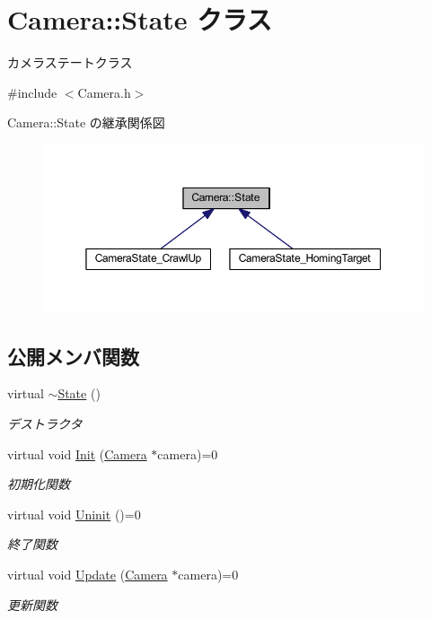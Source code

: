 \hypertarget{class_camera_1_1_state}{}\section{Camera\+:\+:State クラス}
\label{class_camera_1_1_state}


カメラステートクラス  




{\ttfamily \#include $<$Camera.\+h$>$}



Camera\+:\+:State の継承関係図\nopagebreak
\begin{figure}[H]
\begin{center}
\leavevmode
\includegraphics[width=350pt]{class_camera_1_1_state__inherit__graph}
\end{center}
\end{figure}
\subsection*{公開メンバ関数}
\begin{DoxyCompactItemize}
\item 
virtual \mbox{\hyperlink{class_camera_1_1_state_a61b74bb711d49e26c0f07af65fb74eb9}{$\sim$\+State}} ()
\begin{DoxyCompactList}\small\item\em デストラクタ \end{DoxyCompactList}\item 
virtual void \mbox{\hyperlink{class_camera_1_1_state_aa1b81471ab15e64b3117ffe7de9560ff}{Init}} (\mbox{\hyperlink{class_camera}{Camera}} $\ast$camera)=0
\begin{DoxyCompactList}\small\item\em 初期化関数 \end{DoxyCompactList}\item 
virtual void \mbox{\hyperlink{class_camera_1_1_state_adb3f43b6c3f8100da7877867180e804b}{Uninit}} ()=0
\begin{DoxyCompactList}\small\item\em 終了関数 \end{DoxyCompactList}\item 
virtual void \mbox{\hyperlink{class_camera_1_1_state_a2d41e0cb783666bae6c6ea167fcc7874}{Update}} (\mbox{\hyperlink{class_camera}{Camera}} $\ast$camera)=0
\begin{DoxyCompactList}\small\item\em 更新関数 \end{DoxyCompactList}\end{DoxyCompactItemize}


